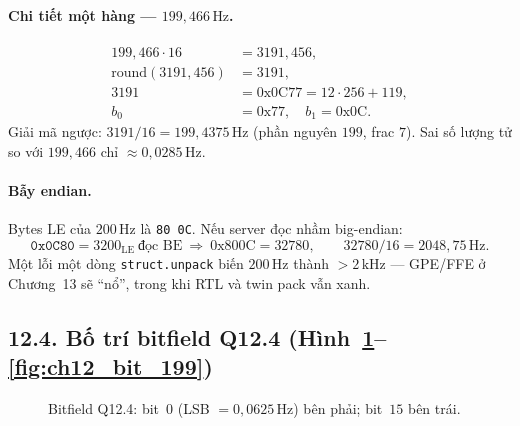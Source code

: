 \paragraph{Chi tiết một hàng --- $199{,}466\,\text{Hz}$.}
\begin{align*}
199{,}466\cdot 16 &= 3191{,}456,\\
\mathrm{round}(3191{,}456) &= 3191,\\
3191 &= 0\text{x}0\text{C}77 = 12\cdot 256 + 119,\\
b_0 &= 0\text{x}77,\quad b_1=0\text{x}0\text{C}.
\end{align*}
Giải mã ngược: $3191/16=199{,}4375\,\text{Hz}$ (phần nguyên $199$, frac $7$). Sai số lượng tử so với $199{,}466$ chỉ $\approx 0{,}0285\,\text{Hz}$.

\paragraph{Bẫy endian.} Bytes LE của $200\,\text{Hz}$ là \texttt{80 0C}. Nếu server đọc nhầm big-endian:
\[
\texttt{0x0C80}=3200_{\mathrm{LE}}\ \text{đọc BE}\ \Rightarrow\ 0\text{x}800\text{C} = 32780,\qquad 32780/16=2048{,}75\,\text{Hz}.
\]
Một lỗi một dòng \texttt{struct.unpack} biến $200\,\text{Hz}$ thành $>2\,\text{kHz}$ --- GPE/FFE ở Chương~13 sẽ ``nổ'', trong khi RTL và twin pack vẫn xanh.

\subsection*{12.4. Bố trí bitfield Q12.4 (Hình~\ref{fig:ch12_bitfield_layout}--\ref{fig:ch12_bit_199})}

\begin{figure}[H]
\centering
{}
\caption{Bitfield Q12.4: bit~$0$ (LSB $=0{,}0625\,\text{Hz}$) bên phải; bit~$15$ bên trái.}
\label{fig:ch12_bitfield_layout}
\end{figure}

